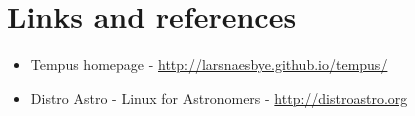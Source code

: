 \section{Links and references}

\begin{itemize}
    \item Tempus homepage - \url{http://larsnaesbye.github.io/tempus/}
    \item Distro Astro - Linux for Astronomers - \url{http://distroastro.org}
\end{itemize}

